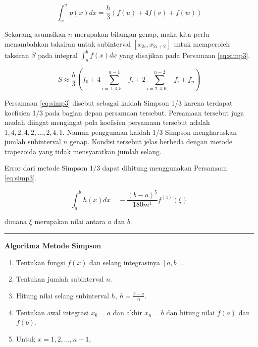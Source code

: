 \documentclass[
]{book}
\providecommand{\tightlist}{%
  \setlength{\itemsep}{0pt}\setlength{\parskip}{0pt}}
\theoremstyle{definition}
\theoremstyle{definition}
\theoremstyle{definition}
\theoremstyle{definition}
\theoremstyle{remark}
\begin{document}
\begin{equation}
\int_w^up\left(x\right)dx=\frac{h}{3}\left(f\left(u\right)+4f\left(v\right)+f\left(w\right)\right)
  \label{eq:simp2}
\end{equation}

Sekarang asumsikan \(n\) merupakan bilangan genap, maka kita perlu menambahkan taksiran untuk subinterval \(\left[x_{2i},x_{2i+2}\right]\) untuk memperoleh taksiran \(S\) pada integral \(\int_{a}^b f\left(x\right)dx\) yang disajikan pada Persamaan \eqref{eq:simp3}.

\begin{equation}
S\approx\frac{h}{3}\left(f_0+4\sum_{i=1,3,5.\dots}^{n-1}f_i+2\sum_{i=2,4,6,\dots}^{n-2}f_i+f_n\right)
  \label{eq:simp3}
\end{equation}

Persamaan \eqref{eq:simp3} disebut sebagai kaidah Simpson 1/3 karena terdapat koefisien 1/3 pada bagian depan persamaan tersebut. Persamaan tersebut juga mudah diingat mengingat pola koefisien persamaan tersebut adalah \(1,4,2,4,2,\dots ,2,4,1\). Namun penggunaan kaidah 1/3 Simpson mengharuskan jumlah subinterval \(n\) genap. Kondisi tersebut jelas berbeda dengan metode trapezoida yang tidak mensyaratkan jumlah selang.

Error dari metode Simpson 1/3 dapat dihitung menggunakan Persamaan \eqref{eq:simp3}.

\begin{equation}
\int_a^bh\left(x\right)dx=-\ \frac{\left(b-a\right)^5}{180m^4}f^{\left(4\right)}\left(\xi\right)
  \label{eq:simp4}
\end{equation}

dimana \(\xi\) merupakan nilai antara \(a\) dan \(b\).

\begin{center}\rule{0.5\linewidth}{0.5pt}\end{center}

\textbf{Algoritma Metode Simpson}

\begin{enumerate}
\def\labelenumi{\arabic{enumi}.}
\tightlist
\item
  Tentukan fungsi \(f\left(x\right)\) dan selang integrasinya \(\left[a,b\right]\).
\item
  Tentukan jumlah subinterval \(n\).
\item
  Hitung nilai selang subinterval \(h\), \(h=\frac{b-a}{n}\).
\item
  Tentukan awal integrasi \(x_0=a\) dan akhir \(x_n=b\) dan hitung nilai \(f\left(a\right)\) dan \(f\left(b\right)\).
\item
  Untuk \(x=1,2,\dots,n-1\),
\end{enumerate}
\end{document}
